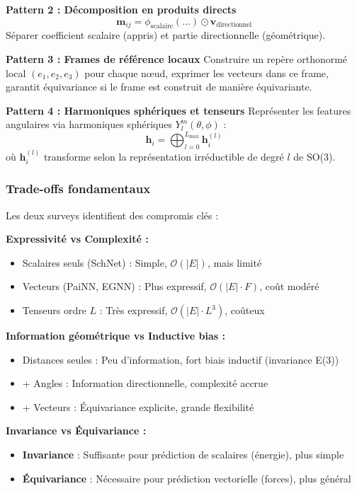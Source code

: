 \textbf{Pattern 2 : Décomposition en produits directs}
\[
\mathbf{m}_{ij} = \phi_{\text{scalaire}}(\ldots) \odot \mathbf{v}_{\text{directionnel}}
\]
Séparer coefficient scalaire (appris) et partie directionnelle (géométrique).

\textbf{Pattern 3 : Frames de référence locaux}
Construire un repère orthonormé local $(e_1, e_2, e_3)$ pour chaque nœud, exprimer les vecteurs dans ce frame, garantit équivariance si le frame est construit de manière équivariante.

\textbf{Pattern 4 : Harmoniques sphériques et tenseurs}
Représenter les features angulaires via harmoniques sphériques $Y_l^m(\theta, \phi)$ :
\[
\mathbf{h}_i = \bigoplus_{l=0}^{L_{\max}} \mathbf{h}_i^{(l)}
\]
où $\mathbf{h}_i^{(l)}$ transforme selon la représentation irréductible de degré $l$ de SO(3).

\subsubsection{Trade-offs fondamentaux}

Les deux surveys identifient des compromis clés :

\textbf{Expressivité vs Complexité :}
\begin{itemize}
    \item Scalaires seuls (SchNet) : Simple, $\mathcal{O}(|E|)$, mais limité
    \item Vecteurs (PaiNN, EGNN) : Plus expressif, $\mathcal{O}(|E| \cdot F)$, coût modéré
    \item Tenseurs ordre $L$ : Très expressif, $\mathcal{O}(|E| \cdot L^3)$, coûteux
\end{itemize}

\textbf{Information géométrique vs Inductive bias :}
\begin{itemize}
    \item Distances seules : Peu d'information, fort biais inductif (invariance E(3))
    \item + Angles : Information directionnelle, complexité accrue
    \item + Vecteurs : Équivariance explicite, grande flexibilité
\end{itemize}

\textbf{Invariance vs Équivariance :}
\begin{itemize}
    \item \textbf{Invariance} : Suffisante pour prédiction de scalaires (énergie), plus simple
    \item \textbf{Équivariance} : Nécessaire pour prédiction vectorielle (forces), plus général
\end{itemize}


